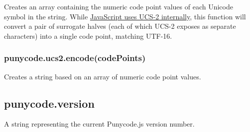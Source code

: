 Creates an array containing the numeric code point values of each
Unicode symbol in the string. While
\href{http://mathiasbynens.be/notes/javascript-encoding}{JavaScript uses
UCS-2 internally}, this function will convert a pair of surrogate halves
(each of which UCS-2 exposes as separate characters) into a single code
point, matching UTF-16.

\begin{Shaded}
\begin{Highlighting}[]
\NormalTok{(}\NormalTok{); }\CommentTok{// [0x61, 0x62, 0x63]}
\NormalTok{(}\NormalTok{); }\CommentTok{// [0x1D306]}
\end{Highlighting}
\end{Shaded}

\subsubsection{punycode.ucs2.encode(codePoints)}\label{punycode.ucs2.encodecodepoints}

Creates a string based on an array of numeric code point values.

\begin{Shaded}
\begin{Highlighting}[]
\NormalTok{([}\NormalTok{, }\NormalTok{, }\NormalTok{]); }
\NormalTok{([}\NormalTok{]); }
\end{Highlighting}
\end{Shaded}

\subsection{punycode.version}\label{punycode.version}

A string representing the current Punycode.js version number.
